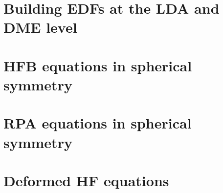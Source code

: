 \documentclass[letterpaper,12pt]{article}
\begin{document}

%

\section{Building EDFs at the LDA and DME level}

\section{HFB equations in spherical symmetry}




\section{RPA equations in spherical symmetry}




\section{Deformed HF equations}



\end{document}
